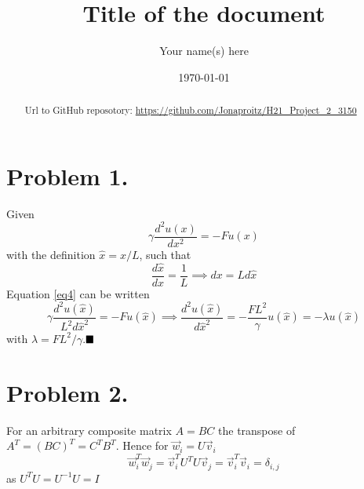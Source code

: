 \documentclass[english,notitlepage]{revtex4-1}  %
\begin{document}
\title{Title of the document}      %
\author{Your name(s) here}          %
\date{\today}                             %
\noaffiliation                            %

\begin{abstract}
    Url to GitHub reposotory: \url{https://github.com/Jonaproitz/H21_Project_2_3150}
\end{abstract}
\maketitle 
    

\section*{Problem 1.}
    Given
    \begin{equation}
            \gamma \frac{d^2 u(x)}{d x^2}
        =   -Fu(x)
        \label{eq4}
    \end{equation}
    with the definition $\hat{x} = x/L$, such that
    \begin{equation*}
            \frac{d\hat{x}}{d x}
        =   \frac{1}{L}
        \implies 
            dx
        =   L d\hat{x}
    \end{equation*}
    Equation \ref{eq4} can be written
    \begin{equation*}
            \gamma \frac{d^2 u(\hat{x})}{L^2 d\hat{x}^2}
        =   -Fu(\hat{x})
        \implies
            \frac{d^2 u(\hat{x})}{d \hat{x}^2}
        =   -\frac{FL^2}{\gamma}u(\hat{x})
        =   -\lambda u(\hat{x})
    \end{equation*}
    with $\lambda = FL^2/\gamma$.$\hfill\blacksquare$


\section*{Problem 2.}
    For an arbitrary composite matrix $A = BC$ the transpose of $A^T = (BC)^T = C^TB^T$.
    Hence for $\vec{w}_i = U\vec{v}_i$
    \begin{equation*}
            \vec{w}^T_i\vec{w}_j
        =   \vec{v}^T_iU^TU\vec{v}_j
        =   \vec{v}^T_i\vec{v}_i
        =   \delta_{i,j}
    \end{equation*}
    as $U^TU = U^{-1}U = I$
\end{document}
